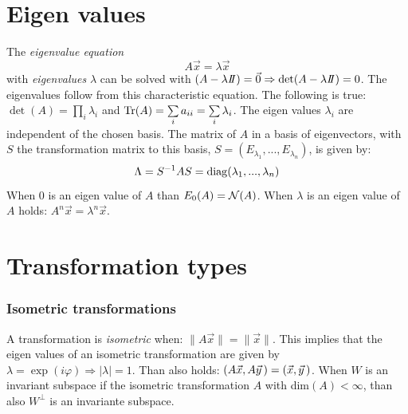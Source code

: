 \documentclass[twoside]{report}
\begin{document}
\section{Eigen values}
The {\it eigenvalue equation}
\[
A\vec{x}=\lambda\vec{x}
\]
with {\it eigenvalues} $\lambda$ can be solved with
$(A-\lambda I\hspace{-1mm}I)=\vec{0}\Rightarrow\det(A-\lambda I\hspace{-1mm}I)=0$. The eigenvalues
follow from this characteristic equation. The following is true:
$\det(A)=\prod\limits_i\lambda_i$ and
${\rm Tr}(A)=\sum\limits_ia_{ii}=\sum\limits_i\lambda_i$.
\npar
The eigen values $\lambda_i$ are independent of the chosen basis.
The matrix of $A$ in a basis of eigenvectors, with $S$ the transformation matrix
to this basis, $S=(E_{\lambda_1},...,E_{\lambda_n})$, is given by:
\[
\Lambda=S^{-1}AS={\rm diag}(\lambda_1,...,\lambda_n)
\]
When 0 is an eigen value of $A$ than $E_0(A)={\cal N}(A)$.
\npar
When $\lambda$ is an eigen value of $A$ holds: $A^n\vec{x}=\lambda^n\vec{x}$.

\section{Transformation types}
\subsubsection{Isometric transformations}
A transformation is {\it isometric} when: $\|A\vec{x}\|=\|\vec{x}\|$. This
implies that the eigen values of an isometric transformation are given by
$\lambda=\exp(i\varphi)\Rightarrow|\lambda|=1$. Than also holds:
$(A\vec{x},A\vec{y}\,)=(\vec{x},\vec{y}\,)$.
\npar
When $W$ is an invariant subspace if the isometric transformation $A$ with
dim$(A)<\infty$, than also $W^\perp$ is an invariante subspace.
\end{document}
